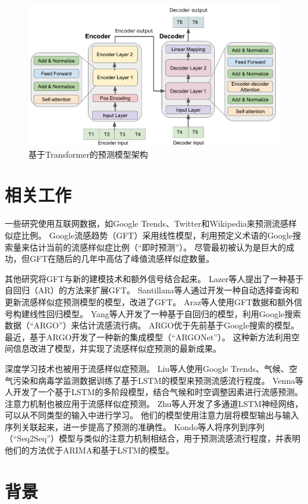 \begin{figure}
    \includegraphics[width=\textwidth]{transformer_architecture.pdf}
    \caption{基于Transformer的预测模型架构}
  \end{figure}
  
  \section{相关工作}
  一些研究使用互联网数据，如Google Trends、Twitter和Wikipedia来预测流感样似症比例。
  Google流感趋势（GFT）采用线性模型，利用预定义术语的Google搜索量来估计当前的流感样似症比例（“即时预测”）。
  尽管最初被认为是巨大的成功，但GFT在随后的几年中高估了峰值流感样似症数量。
  
  其他研究将GFT与新的建模技术和额外信号结合起来。
  Lazer等人提出了一种基于自回归（AR）的方法来扩展GFT。
  Santillana等人通过开发一种自动选择查询和更新流感样似症预测模型的模型，改进了GFT。
  Araz等人使用GFT数据和额外信号构建线性回归模型。
  Yang等人开发了一种基于自回归的模型，利用Google搜索数据（“ARGO”）来估计流感流行病。
  ARGO优于先前基于Google搜索的模型。
  最近，基于ARGO开发了一种新的集成模型（“ARGONet”）。
  这种新方法利用空间信息改进了模型，并实现了流感样似症预测的最新成果。
  
  深度学习技术也被用于流感样似症预测。
  Liu等人使用Google Trends、气候、空气污染和病毒学监测数据训练了基于LSTM的模型来预测流感流行程度。
  Venna等人开发了一个基于LSTM的多阶段模型，结合气候和时空调整因素进行流感预测。
  注意力机制也被应用于流感样似症预测。
  Zhu等人开发了多通道LSTM神经网络，可以从不同类型的输入中进行学习。
  他们的模型使用注意力层将模型输出与输入序列关联起来，进一步提高了预测的准确性。
  Kondo等人将序列到序列（“Seq2Seq”）模型与类似的注意力机制相结合，用于预测流感流行程度，并表明他们的方法优于ARIMA和基于LSTM的模型。
    
  \section{背景}
